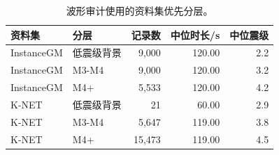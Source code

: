 \begin{table}[!htbp]
\centering
\caption{波形审计使用的资料集优先分层。}
\label{tab:priority}
\begin{singlespace}
\footnotesize
\setlength{\tabcolsep}{3pt}
\begin{tabular*}{0.76\textwidth}{@{\extracolsep{\fill}}llrrr@{}}
\toprule
资料集 & 分层 & 记录数 & 中位时长/s & 中位震级 \\
\midrule
InstanceGM & 低震级背景 & 9,000 & 120.00 & 2.2 \\
InstanceGM & M3-M4 & 9,000 & 120.00 & 3.2 \\
InstanceGM & M4+ & 5,533 & 120.00 & 4.2 \\
K-NET & 低震级背景 & 21 & 60.00 & 2.9 \\
K-NET & M3-M4 & 5,647 & 119.00 & 3.8 \\
K-NET & M4+ & 15,473 & 119.00 & 4.5 \\
\bottomrule
\end{tabular*}
\end{singlespace}
\end{table}
